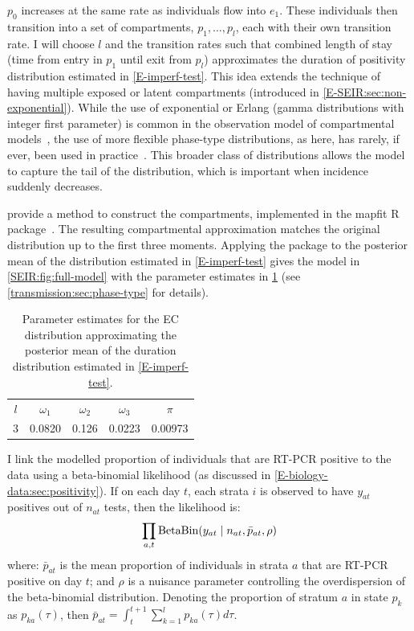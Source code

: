 \documentclass[thesis.tex]{subfiles}
\begin{document}
$p_0$ increases at the same rate as individuals flow into $e_1$.
These individuals then transition into a set of compartments, $p_1, \dots, p_l$, each with their own transition rate.
I will choose $l$ and the transition rates such that combined length of stay (\ie time from entry in $p_1$ until exit from $p_l$) approximates the duration of positivity distribution estimated in \cref{E-imperf-test}.
This idea extends the technique of having multiple exposed or latent compartments (introduced in \cref{E-SEIR:sec:non-exponential}).
While the use of exponential or Erlang (gamma distributions with integer first parameter) is common in the observation model of compartmental models~\autocite[e.g.][]{overtonEpiBeds}, the use of more flexible phase-type distributions, as here, has rarely, if ever, been used in practice~\autocite{hurtadoGLCT}.
This broader class of distributions allows the model to capture the tail of the distribution, which is important when incidence suddenly decreases.

\Textcite{osogamiClosed} provide a method to construct the compartments, implemented in the mapfit R package~\autocite{mapfit}. 
The resulting compartmental approximation matches the original distribution up to the first three moments.
Applying the package to the posterior mean of the distribution estimated in \cref{E-imperf-test} gives the model in \cref{SEIR:fig:full-model} with the parameter estimates in \cref{SEIR:table:ec-params} (see \cref{transmission:sec:phase-type} for details).
\begin{table}
    \centering
    \begin{tabular}{c c c c c}
        $l$ & $\omega_1$ & $\omega_{2}$ & $\omega_{3}$ & $\pi$ \\
        3 & 0.0820 & 0.126 & 0.0223 & 0.00973  \\
    \end{tabular}
    \caption{Parameter estimates for the EC distribution approximating the posterior mean of the duration distribution estimated in \cref{E-imperf-test}.}
    \label{SEIR:table:ec-params}
\end{table}

I link the modelled proportion of individuals that are RT-PCR positive to the data using a beta-binomial likelihood (as discussed in \cref{E-biology-data:sec:positivity}).
If on each day $t$, each strata $i$ is observed to have $y_{at}$ positives out of $n_{at}$ tests, then the likelihood is:
\begin{align}
    \prod_{a,t} \operatorname{BetaBin} (y_{at} \mid n_{at}, \bar{p}_{at}, \rho)
    \label{SEIR:eq:likelihood}
\end{align}
where: $\bar{p}_{at}$ is the mean proportion of individuals in strata $a$ that are RT-PCR positive on day $t$; and $\rho$ is a nuisance parameter controlling the overdispersion of the beta-binomial distribution.
Denoting the proportion of stratum $a$ in state $p_k$ as $p_{ka}(\tau)$, then $\bar{p}_{at} = \int_{t}^{t+1} \sum_{k=1}^l p_{ka}(\tau) d\tau$.
\end{document}
